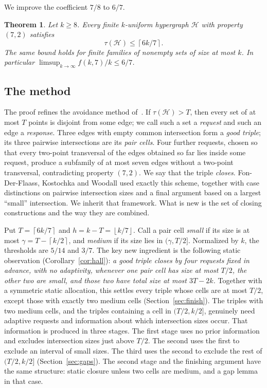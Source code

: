 \documentclass[11pt]{article}
\numberwithin{equation}{section}
\newtheorem{theorem}{Theorem}[section]
\theoremstyle{definition}
\theoremstyle{remark}
\newcommand{\HH}{\mathcal H}
\newcommand{\ceil}[1]{\left\lceil #1\right\rceil}
\newcommand{\floor}[1]{\left\lfloor #1\right\rfloor}
\begin{document}
We improve the coefficient $7/8$ to $6/7$.

\begin{theorem}\label{thm:main}
Let $k\ge8$. Every finite $k$-uniform hypergraph $\HH$ with property
$(7,2)$ satisfies
\[
 \tau(\HH)\le\ceil{6k/7}.
\]
The same bound holds for finite families of nonempty sets of size at
most $k$. In particular $\limsup_{k\to\infty}f(k,7)/k\le6/7$.
\end{theorem}

\subsection*{The method}
The proof refines the avoidance method of~\cite{FKW}. If
$\tau(\HH)>T$, then every set of at most $T$ points is disjoint from
some edge; we call such a set a \emph{request} and such an edge a
\emph{response}. Three edges with empty common intersection form a
\emph{good triple}; its three pairwise intersections are its \emph{pair
cells}. Four further requests, chosen so that every two-point
transversal of the edges obtained so far lies inside some request,
produce a subfamily of at most seven edges without a two-point
transversal, contradicting property $(7,2)$. We say that the triple
\emph{closes}. Fon-Der-Flaass, Kostochka and Woodall used exactly this
scheme, together with case distinctions on pairwise intersection sizes
and a final argument based on a largest ``small'' intersection. We
inherit that framework. What is new is the set of closing constructions
and the way they are combined.

Put $T=\ceil{6k/7}$ and $h=k-T=\floor{k/7}$. Call a pair cell
\emph{small} if its size is at most $\gamma=T-\ceil{k/2}$, and
\emph{medium} if its size lies in $(\gamma,T/2]$. Normalized by $k$, the
thresholds are $5/14$ and $3/7$. The key new ingredient is the
following static observation (Corollary~\ref{cor:hall}): \emph{a good
triple closes by four requests fixed in advance, with no adaptivity,
whenever one pair cell has size at most $T/2$, the other two are small,
and those two have total size at most $3T-2k$.} Together with a
symmetric static allocation, this settles every triple whose cells are
at most $T/2$, except those with exactly two medium cells
(Section~\ref{sec:finish}). The triples with two medium cells, and the
triples containing a cell in $(T/2,k/2]$, genuinely need adaptive
requests and information about which intersection sizes occur. That
information is produced in three stages. The first stage uses no prior
information and excludes intersection sizes just above $T/2$. The
second uses the first to exclude an interval of small sizes. The third
uses the second to exclude the rest of $(T/2,k/2]$
(Section~\ref{sec:gaps}). The second stage and the finishing argument
have the same structure: static closure unless two cells are medium,
and a gap lemma in that case.
\end{document}

